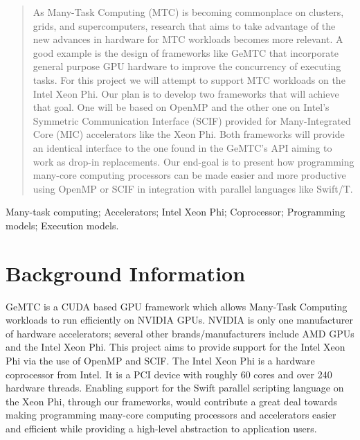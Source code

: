 \documentclass[10pt, conference, compsocconf]{IEEEtran}
\begin{document}
\begin{abstract}
As Many-Task Computing (MTC) is becoming commonplace on clusters, grids, and supercomputers, research that aims to take advantage of the new advances in hardware for MTC workloads becomes more relevant. A good example is the design of frameworks like GeMTC that incorporate general purpose GPU hardware to improve the concurrency of executing tasks. For this project we will attempt to support MTC workloads on the Intel Xeon Phi. Our plan is to develop two frameworks that will achieve that goal. One will be based on OpenMP and the other one on Intel’s Symmetric Communication Interface (SCIF) provided for Many-Integrated Core (MIC) accelerators like the Xeon Phi. Both frameworks will provide an identical interface to the one found in the GeMTC’s API aiming to work as drop-in replacements. Our end-goal is to present how programming many-core computing processors can be made easier and more productive using OpenMP or SCIF in integration with parallel languages like Swift/T.

\end{abstract}

\begin{IEEEkeywords}
Many-task computing; Accelerators; Intel Xeon Phi; Coprocessor; Programming models; Execution models.

\end{IEEEkeywords}


%
\IEEEpeerreviewmaketitle



\section{Background Information}
GeMTC is a CUDA based GPU framework which allows Many-Task Computing workloads to run efficiently on NVIDIA GPUs. NVIDIA is only one manufacturer of hardware accelerators; several other brands/manufacturers include AMD GPUs and the Intel Xeon Phi. This project aims to provide support for the Intel Xeon Phi via the use of OpenMP and SCIF. The Intel Xeon Phi is a hardware coprocessor from Intel. It is a PCI device with roughly 60 cores and over 240 hardware threads. Enabling support for the Swift parallel scripting language on the Xeon Phi, through our frameworks, would contribute a great deal towards making programming many-core computing processors and accelerators easier and efficient while providing a high-level abstraction to application users.
\end{document}
